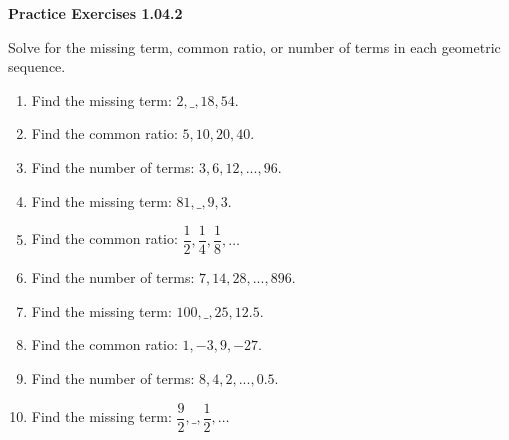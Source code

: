 \vspace{0.3ex}
\noindent\textbf{Practice Exercises 1.04.2}

\vspace{0.2ex}

Solve for the missing term, common ratio, or number of terms in each geometric sequence.
\begin{enumerate}
    \item Find the missing term: $2, \_ , 18, 54$.
    \item Find the common ratio: $5, 10, 20, 40$.
    \item Find the number of terms: $3, 6, 12, ..., 96$.
    \item Find the missing term: $81, \_, 9, 3$.
    \item Find the common ratio: $\dfrac{1}{2}, \dfrac{1}{4}, \dfrac{1}{8}, \dots$
    \item Find the number of terms: $7, 14, 28, ..., 896$.
    \item Find the missing term: $100, \_, 25, 12.5$.
    \item Find the common ratio: $1, -3, 9, -27$.
    \item Find the number of terms: $8, 4, 2, ..., 0.5$.
    \item Find the missing term: $\dfrac{9}{2}, \_, \dfrac{1}{2}, \dots$
\end{enumerate}
